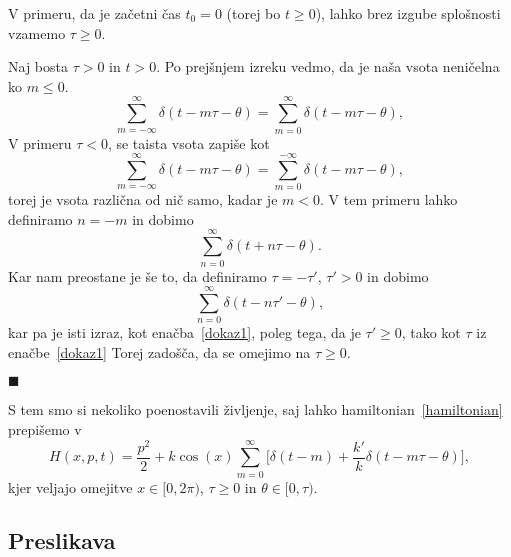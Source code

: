 \documentclass[a4paper, 12pt]{article}
\newenvironment{teorem}
{
	\vspace{6pt}
	\noindent [\emph{Trditev}]
}
{
	
}
\newenvironment{dokaz}
{
	\vspace{6pt}
	\noindent [\emph{Dokaz}]
}
{
	\begin{flushright}
		$\blacksquare$
	\end{flushright}
}
\begin{document}
\begin{teorem}
	V primeru, da je za\v cetni \v cas $t_0 = 0$ (torej bo $t \geq 0$), lahko brez izgube splo\v snosti vzamemo
	$\tau \geq 0$.
\end{teorem}

\begin{dokaz}
	Naj bosta $\tau > 0$ in $t > 0$. Po prej\v snjem izreku vedmo, da je na\v sa vsota neni\v celna ko $m \leq 0$.
	\begin{equation}
		\sum_{m = -\infty}^\infty \delta (t - m\tau - \theta) = \sum_{m = 0}^\infty \delta (t - m\tau - \theta),
		\label{dokaz1}
	\end{equation}
	V primeru $\tau < 0$, se taista vsota zapi\v se kot
	\begin{equation*}
		\sum_{m = -\infty}^\infty \delta (t - m\tau - \theta) = \sum_{m = 0}^{-\infty} \delta (t - m\tau - \theta),
	\end{equation*}
	torej je vsota razli\v cna od ni\v c samo, kadar je $m < 0$. V tem primeru lahko definiramo $n = -m$ in dobimo
	\begin{equation*}
		\sum_{n = 0}^{\infty} \delta (t + n\tau - \theta).
	\end{equation*}
	Kar nam preostane je \v se to, da definiramo $\tau = -\tau'$, $\tau' > 0$ in dobimo
	\begin{equation}
		\sum_{n = 0}^\infty \delta (t - n\tau' - \theta),
	\end{equation}
	kar pa je isti izraz, kot ena\v cba~\eqref{dokaz1}, poleg tega, da je $\tau' \geq 0$, tako kot $\tau$ iz
	ena\v cbe~\eqref{dokaz1} Torej zado\v s\v ca, da se omejimo na $\tau \geq 0$.
\end{dokaz}

S tem smo si nekoliko poenostavili \v zivljenje, saj lahko hamiltonian~\eqref{hamiltonian} prepi\v semo v
\begin{equation}
	H (x, p, t) = \frac{p^2}{2} + k\cos(x)\sum_{m = 0}^{\infty} \Big[\delta (t - m) + \frac{k'}{k}
		\delta(t - m\tau - \theta)\Big],
\end{equation}
kjer veljajo omejitve $x \in [0, 2\pi)$, $\tau \geq 0$ in $\theta \in [0,\tau)$.

\subsection{Preslikava}
\end{document}
